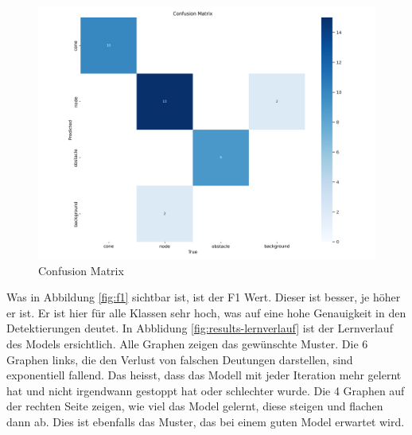 \begin{figure}[H]
    \includegraphics[width=\textwidth]{assets/IT/yolo/confusion_matrix.png}
    \caption{Confusion Matrix}
    \label{fig:conf-matrix}
\end{figure}

Was in Abbildung \ref{fig:f1}  sichtbar ist, ist der F1 Wert. Dieser ist besser, je höher er ist. Er ist hier für alle Klassen sehr hoch, was auf eine hohe Genauigkeit in den Detektierungen deutet. In Abblidung \ref{fig:results-lernverlauf} ist der Lernverlauf des Models ersichtlich. Alle Graphen zeigen das gewünschte Muster. Die 6 Graphen links, die den Verlust von falschen Deutungen darstellen, sind exponentiell fallend. Das heisst, dass das Modell mit jeder Iteration mehr gelernt hat und nicht irgendwann gestoppt hat oder schlechter wurde. Die 4 Graphen auf der rechten Seite zeigen, wie viel das Model gelernt, diese steigen und flachen dann ab. Dies ist ebenfalls das Muster, das bei einem guten Model erwartet wird.\cite{model-performance}


